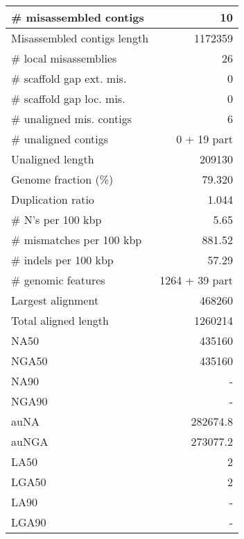 \documentclass[12pt,a4paper]{article}
\begin{document}
\begin{table}[ht]
\begin{center}
\begin{tabular}{|l*{1}{|r}|}
\# misassembled contigs & 10 \\ \hline
Misassembled contigs length & 1172359 \\ \hline
\# local misassemblies & 26 \\ \hline
\# scaffold gap ext. mis. & 0 \\ \hline
\# scaffold gap loc. mis. & 0 \\ \hline
\# unaligned mis. contigs & 6 \\ \hline
\# unaligned contigs & 0 + 19 part \\ \hline
Unaligned length & 209130 \\ \hline
Genome fraction (\%) & 79.320 \\ \hline
Duplication ratio & 1.044 \\ \hline
\# N's per 100 kbp & 5.65 \\ \hline
\# mismatches per 100 kbp & 881.52 \\ \hline
\# indels per 100 kbp & 57.29 \\ \hline
\# genomic features & 1264 + 39 part \\ \hline
Largest alignment & 468260 \\ \hline
Total aligned length & 1260214 \\ \hline
NA50 & 435160 \\ \hline
NGA50 & 435160 \\ \hline
NA90 & - \\ \hline
NGA90 & - \\ \hline
auNA & 282674.8 \\ \hline
auNGA & 273077.2 \\ \hline
LA50 & 2 \\ \hline
LGA50 & 2 \\ \hline
LA90 & - \\ \hline
LGA90 & - \\ \hline
\end{tabular}
\end{center}
\end{table}
\end{document}

